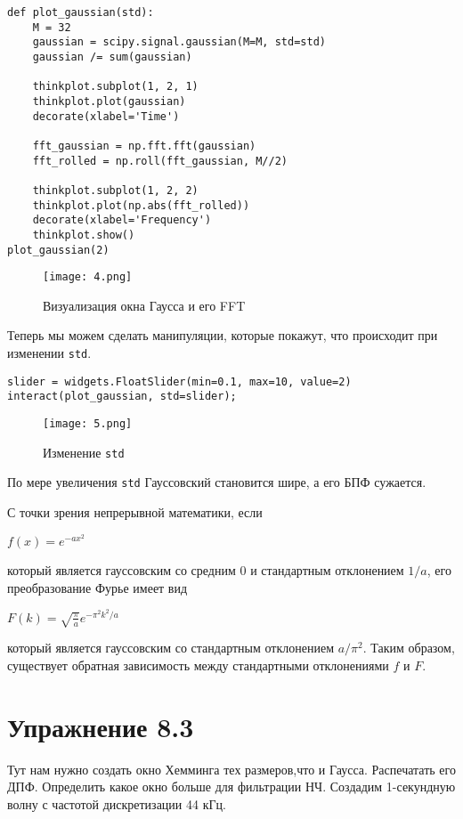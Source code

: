 \documentclass[a4paper,12pt]{report}
\begin{document}
\begin{lstlisting}[caption=Функция \texttt{plot\_gaussian}]
def plot_gaussian(std):
    M = 32
    gaussian = scipy.signal.gaussian(M=M, std=std)
    gaussian /= sum(gaussian)
    
    thinkplot.subplot(1, 2, 1)
    thinkplot.plot(gaussian)
    decorate(xlabel='Time')

    fft_gaussian = np.fft.fft(gaussian)
    fft_rolled = np.roll(fft_gaussian, M//2)
    
    thinkplot.subplot(1, 2, 2)
    thinkplot.plot(np.abs(fft_rolled))
    decorate(xlabel='Frequency')
    thinkplot.show()
plot_gaussian(2)
\end{lstlisting}

\begin{figure}[H]
        \centering
        \texttt{[image: 4.png]}
        \caption{Визуализация окна Гаусса и его FFT}
        \label{fig:lab8_fig2_4}
\end{figure}

Теперь мы можем сделать манипуляции, которые покажут, что происходит при изменении \texttt{std}.

\begin{lstlisting}[caption=Изменение \texttt{std}]
slider = widgets.FloatSlider(min=0.1, max=10, value=2)
interact(plot_gaussian, std=slider);
\end{lstlisting}

\begin{figure}[H]
        \centering
        \texttt{[image: 5.png]}
        \caption{Изменение \texttt{std}}
        \label{fig:lab8_fig2_5}
\end{figure}

По мере увеличения \texttt{std} Гауссовский становится шире, а его БПФ сужается.

С точки зрения непрерывной математики, если

$f(x) = e^{-a x^2}$

который является гауссовским со средним 0 и стандартным отклонением $1/a$, его преобразование Фурье имеет вид

$F(k) = \sqrt{\frac{\pi}{a}} e^{-\pi^2 k^2/a}$

который является гауссовским со стандартным отклонением $a / \pi^2$. Таким образом, существует обратная зависимость между стандартными отклонениями $f$ и $F$.

\chapter{Упражнение 8.3}
Тут нам нужно создать окно Хемминга тех размеров,что и Гаусса. Распечатать его ДПФ. Определить какое окно больше для фильтрации НЧ.
Создадим 1-секундную волну с частотой дискретизации 44 кГц.
\end{document}
